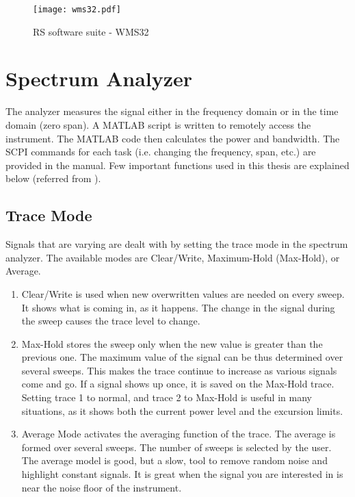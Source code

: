 \begin{figure}[H]
\centering
\texttt{[image: wms32.pdf]}
\caption{\acs{RS} software suite - WMS32}
\label{fig:softwaresuite}
\end{figure}

\section{Spectrum Analyzer}
The analyzer measures the signal either in the frequency domain or in the time domain (zero span). A MATLAB\textregistered{} script is written to remotely access the instrument. The MATLAB\textregistered{} code then calculates the power and bandwidth. The \acf{SCPI} commands for each task (i.e. changing the frequency, span, etc.) are provided in the manual. Few important functions used in this thesis are explained below (referred from \cite{funsspec}).

\subsection{Trace Mode}
Signals that are varying are dealt with by setting the trace mode in the spectrum analyzer. The available modes are Clear/Write, Maximum-Hold (Max-Hold), or Average.
\begin{enumerate}
  \item Clear/Write is used when new overwritten values are needed on every sweep. It shows what is coming in, as it happens. The change in the signal during the sweep causes the trace level to change. 
  \item Max-Hold stores the sweep only when the new value is greater than the previous one. The maximum value of the signal can be thus determined over several sweeps. This makes the trace continue to increase as various signals come and go. If a signal shows up once, it is saved on the Max-Hold trace. Setting trace 1 to normal, and trace 2 to Max-Hold is useful in many situations, as it shows both the current power level and the excursion limits.  
  \item Average Mode activates the averaging function of the trace. The average is formed over several sweeps. The number of sweeps is selected by the user. The average model is good, but a slow, tool to remove random noise and highlight constant signals. It is great when the signal you are interested in is near the noise floor of the instrument.  
  \end{enumerate}

